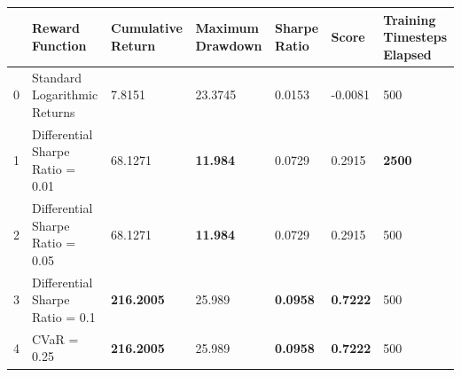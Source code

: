 \begin{tabular}{lllllll}
\toprule
 & Reward Function & Cumulative Return & Maximum Drawdown & Sharpe Ratio & Score & Training Timesteps Elapsed \\
\midrule
0 & Standard Logarithmic Returns & 7.8151 & 23.3745 & 0.0153 & -0.0081 & 500 \\
1 & Differential Sharpe Ratio = 0.01 & 68.1271 & \textbf{11.984} & 0.0729 & 0.2915 & \textbf{2500} \\
2 & Differential Sharpe Ratio = 0.05 & 68.1271 & \textbf{11.984} & 0.0729 & 0.2915 & 500 \\
3 & Differential Sharpe Ratio = 0.1 & \textbf{216.2005} & 25.989 & \textbf{0.0958} & \textbf{0.7222} & 500 \\
4 & CVaR = 0.25 & \textbf{216.2005} & 25.989 & \textbf{0.0958} & \textbf{0.7222} & 500 \\
\bottomrule
\end{tabular}
